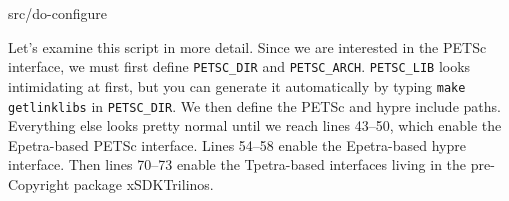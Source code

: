 \begin{lstinputlisting}[caption=do-configure,label=config-script]{src/do-configure}
\end{lstinputlisting}

Let's examine this script in more detail.  Since we are interested in the PETSc
interface, we must first define {\tt PETSC\_DIR} and {\tt PETSC\_ARCH}. 
{\tt PETSC\_LIB} looks intimidating at first, but you can generate it
automatically by typing {\tt make getlinklibs} in {\tt PETSC\_DIR}.  We then
define the PETSc and hypre include paths.  Everything else looks pretty normal
until we reach lines 43--50, which enable the Epetra-based PETSc interface. 
Lines 54--58 enable the Epetra-based hypre interface.  Then lines 70--73 enable
the Tpetra-based interfaces living in the pre-Copyright package xSDKTrilinos.
